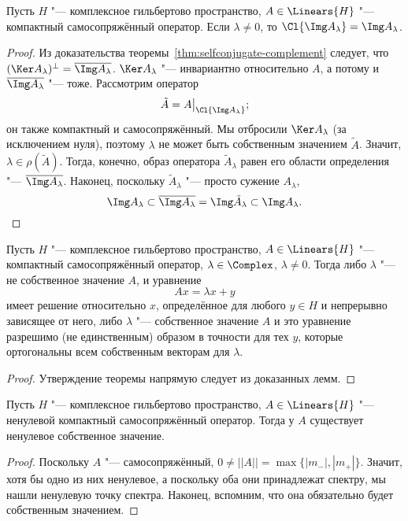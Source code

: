 \documentclass[main]{subfiles}
\begin{document}
\begin{lemma}%
  Пусть \( H \) "--- комплексное гильбертово пространство,
  \( A \in \Linears{H} \) "--- компактный самосопряжённый оператор.
  Если \( \lambda \ne 0 \),
  то \( \Cl{\Img A_\lambda} = \Img A_\lambda \).
\end{lemma}
\begin{proof}
  Из доказательства теоремы~\ref{thm:selfconjugate-complement}
  следует, что \( (\Ker A_\lambda)^\perp = \overline{\Img A_\lambda} \).
  \( \Ker A_\lambda \) "--- инвариантно относительно \( A \),
  а потому и \( \overline{\Img A_\lambda} \) "--- тоже.
  Рассмотрим оператор
  \[ \tilde A = A \bigr|_{\Cl{\Img A_\lambda}};\]
  он также компактный и самосопряжённый.
  Мы отбросили
  \( \Ker A_\lambda \) (за исключением нуля),
  поэтому  \( \lambda \)
  не может быть собственным значением \( \tilde A \).
  Значит, \( \lambda \in \rho(\tilde A) \).
  Тогда, конечно, образ оператора \( \tilde A_\lambda \) равен
  его области определения "--- \( \overline{\Img A_\lambda} \).
  Наконец, поскольку \( \tilde A_\lambda \) "--- просто сужение \( A_\lambda \),
  \[
    \Img A_\lambda \subset
    \overline{\Img A_\lambda} =
    \Img \tilde A_\lambda \subset
    \Img A_\lambda. \qedhere
  \]
\end{proof}

\begin{theorem*}
  Пусть \( H \) "--- комплексное гильбертово пространство,
  \( A \in \Linears{H} \) "--- компактный самосопряжённый оператор,
  \( \lambda \in \Complex \), \( \lambda \ne 0 \).
  Тогда либо \( \lambda \) "--- не собственное значение \( A \),
  и уравнение
  \[
    A x = \lambda x + y
  \]
  имеет решение относительно \( x \),
  определённое для любого \( y \in H \) и
  непрерывно зависящее от него,
  либо \( \lambda \) "--- собственное значение \( A \)
  и это уравнение разрешимо
  (не единственным) образом
  в точности для тех \( y \), которые ортогональны
  всем собственным векторам для \( \lambda \).
\end{theorem*}
\begin{proof}
  Утверждение теоремы напрямую следует из доказанных лемм.
\end{proof}

\begin{lemma}\label{thm:ksco-eigenvalue}
  Пусть \( H \) "--- комплексное гильбертово пространство,
  \( A \in \Linears{H} \) "--- ненулевой компактный самосопряжённый оператор.
  Тогда у \( A \) существует ненулевое собственное значение.
\end{lemma}
\begin{proof}
  Поскольку \( A \) "--- самосопряжённый,
  \( 0 \ne ||A|| = \max \{ |m_-|, |m_+| \} \).
  Значит, хотя бы одно из них ненулевое,
  а поскольку оба они принадлежат спектру,
  мы нашли ненулевую точку спектра. Наконец,
  вспомним, что она обязательно будет
  собственным значением.
\end{proof}
\end{document}
